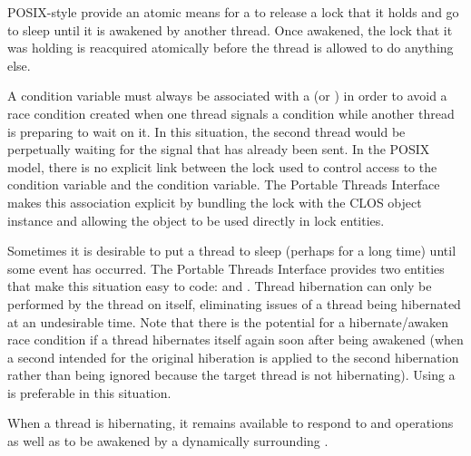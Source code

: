
POSIX-style  provide an atomic means for a
 to release a lock that it holds and go to sleep until it is
awakened by another thread.  Once awakened, the lock that it was holding is
reacquired atomically before the thread is allowed to do anything else.

A condition variable must always be associated with a  (or
) in order to avoid a race condition created when one
thread signals a condition while another thread is preparing to wait on it.
In this situation, the second thread would be perpetually waiting for the
signal that has already been sent.  In the POSIX model, there is no explicit
link between the lock used to control access to the condition variable and the
condition variable.  The Portable Threads Interface makes this association
explicit by bundling the lock with the
 CLOS object instance and allowing
the  object to be used directly in
lock entities.


Sometimes it is desirable to put a thread to sleep (perhaps for a long time) until some event has occurred.  The Portable Threads Interface provides two entities that make this situation easy to code:  and .  Thread hibernation can only be performed by the thread on itself, eliminating issues of a thread being hibernated at an undesirable time.  Note that there is the potential for a hibernate/awaken race condition if a thread hibernates itself again soon after being awakened (when a second  intended for the original hiberation is applied to the second hibernation rather than being ignored because the target thread is not hibernating).  Using a  is preferable in this situation.

When a thread is hibernating, it remains available to respond to  and  operations as well as to be awakened by a dynamically surrounding .


